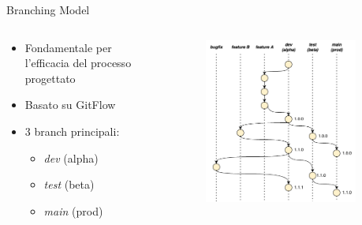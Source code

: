     \begin{frame}{Branching Model}
        \begin{columns}[onlytextwidth]
            \begin{column}{0.5\textwidth}
                \begin{itemize}
                    \item Fondamentale per l'efficacia del processo progettato
                    \item Basato su GitFlow
                    \item 3 branch principali:
                    \begin{itemize}
                        \item \textit{dev} (alpha)
                        \item \textit{test} (beta)
                        \item \textit{main} (prod)
                    \end{itemize}
                \end{itemize}
            \end{column}
            \begin{column}{0.5\textwidth}
                \begin{figure}[H]
                    \centering
                    \includegraphics[width=0.9\textwidth]{img/tesi-13-branching.drawio.png}
                \end{figure}
            \end{column}
        \end{columns}
    \end{frame}
    
